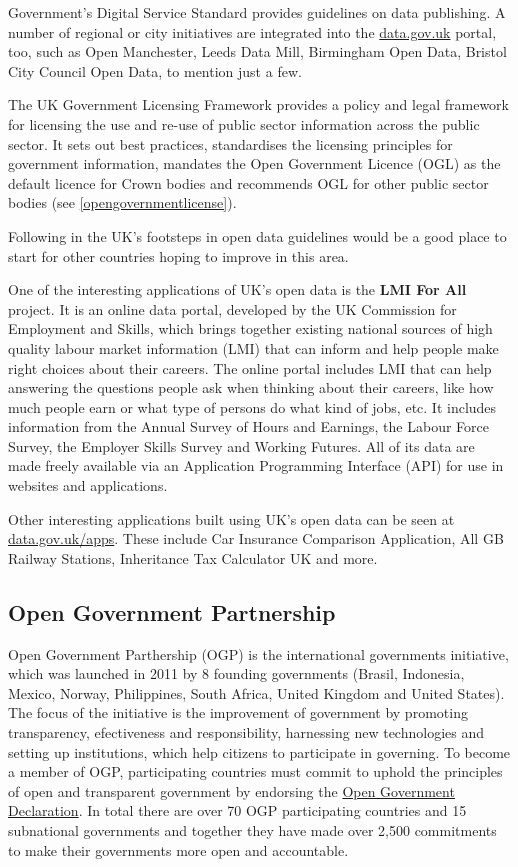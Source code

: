 \documentclass[thesis=B,english]{FITthesis}[2012/06/26]
\begin{document}
Government’s Digital Service Standard provides guidelines on data publishing. A number of regional or city initiatives are integrated into the \linebreak\href{https://data.gov.uk}{data.gov.uk} portal, too, such as Open Manchester, Leeds Data Mill, Birmingham Open Data, Bristol City Council Open Data, to mention just a few.

The UK Government Licensing Framework provides a policy and legal framework for licensing the use and re-use of public sector information across the public sector. It sets out best practices, standardises the licensing principles for government information, mandates the Open Government Licence (OGL) as the default licence for Crown bodies and recommends OGL for other public sector bodies (see \ref{opengovernmentlicense}).

Following in the UK’s footsteps in open data guidelines would be a good place to start for other countries hoping to improve in this area.\cite{UKopendatagov}

One of the interesting applications of UK's open data is the \textbf{LMI For All} project. It is an online data portal, developed by the UK Commission for Employment and Skills, which brings together existing national sources of high quality labour market information (LMI) that can inform and help people make right choices about their careers. The online portal includes LMI that can help answering the questions people ask when thinking about their careers, like how much people earn or what type of persons do what kind of jobs, etc. It includes information from the Annual Survey of Hours and Earnings, the Labour Force Survey, the Employer Skills Survey and Working Futures. All of its data are made freely available  via an Application Programming Interface (API) for use in websites and applications.

Other interesting applications built using UK's open data can be seen at \href{https://data.gov.uk/apps}{data.gov.uk/apps}. These include Car Insurance Comparison Application, All GB Railway Stations, Inheritance Tax Calculator UK and more.


	\subsection{Open Government Partnership}
	Open Government Parthership (OGP) is the international governments initiative, which was launched in 2011 by 8 founding governments (Brasil, Indonesia, Mexico, Norway, Philippines, South Africa, United Kingdom and United States). The focus of the initiative is the improvement of government by promoting transparency, efectiveness and responsibility, harnessing new technologies and setting up institutions, which help citizens to participate in governing. To become a member of OGP, participating countries must commit to uphold the principles of open and transparent government by endorsing the \href{https://www.opengovpartnership.org/open-government-declaration}{Open Government Declaration}. In total there are over 70 OGP participating countries and 15 subnational governments and together they have made over 2,500 commitments to make their governments more open and accountable. \cite{opengovernmentpartnership}
	
\end{document}
